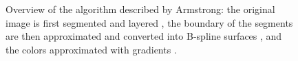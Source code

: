 \documentclass[]{usiinfbachelorproject}
\begin{document}
\begin{figure}[ht]
	\centering
	\caption{Overview of the algorithm described by Armstrong: the original image  is first segmented and layered , the boundary of the segments are then approximated  and converted into B-spline surfaces , and the colors approximated with gradients .}
	\label{fig:armstrong}
\end{figure}
\end{document}
